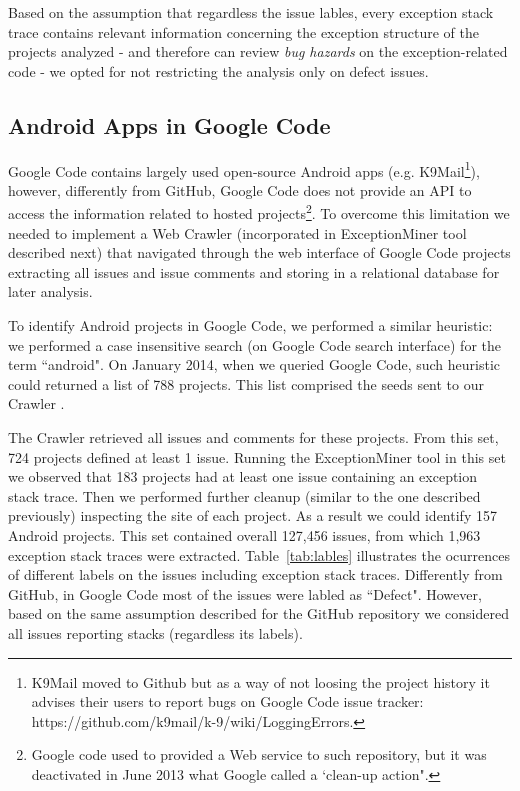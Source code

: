 \documentclass[conference]{IEEEtran}
\begin{document}
Based on the assumption that regardless the issue lables, every exception stack
trace contains relevant information concerning the exception structure of the
projects analyzed - and therefore can review \emph{bug hazards} on the exception-related code -  
we opted for not restricting the analysis only on defect issues.


\subsection{Android Apps in Google Code}
Google Code contains largely used open-source Android apps (e.g. K9Mail\footnote{K9Mail moved to Github but as a way of not loosing the project history it advises their users to report bugs on Google Code issue tracker: https://github.com/k9mail/k-9/wiki/LoggingErrors.}),
 however, differently from GitHub, Google Code does not provide an API to access the information related
 to hosted projects\footnote{Google code used to provided a Web service to such repository, but it was deactivated in June 2013 what Google called a `clean-up action".}.
To overcome this limitation we needed to implement a Web Crawler (incorporated in ExceptionMiner tool described next) that navigated 
through the web interface of Google Code projects extracting all issues and issue comments and storing in a relational database for later analysis.

To identify Android projects in Google Code, we performed a similar heuristic: we performed a case insensitive search 
(on Google Code search interface) for the term ``android". On January 2014, when we queried Google Code, such heuristic could
 returned a list of 788  projects. This list comprised the seeds sent to our Crawler .

The Crawler retrieved all issues and comments for these projects.
From this set, 724 projects defined at least 1 issue. Running the ExceptionMiner tool 
 in this set we observed that 183 projects had at least one issue containing an exception stack trace.
 Then we performed further cleanup (similar to the one described previously) inspecting the site 
of each project. As a result we could identify 157 Android projects.  This set contained overall 127,456 issues,
 from which 1,963 exception stack traces were extracted. Table~\ref{tab:lables} illustrates the ocurrences of different labels 
on the issues including exception stack traces. Differently from GitHub, in Google Code most of 
the issues were labled as ``Defect". However, based on the same assumption described for the GitHub repository
 we considered all issues reporting stacks (regardless its labels).
\end{document}
